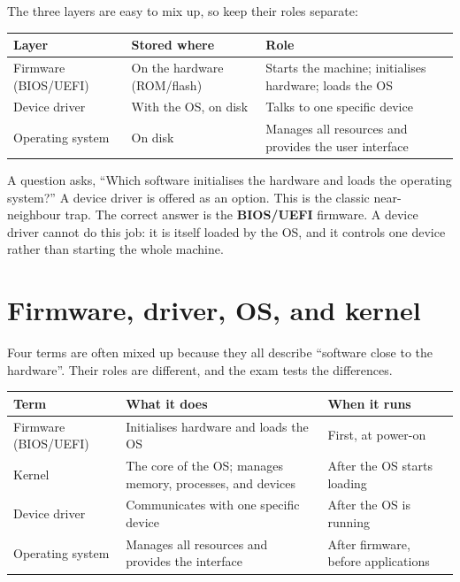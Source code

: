 The three layers are easy to mix up, so keep their roles separate:

\begin{center}
\begin{tabular}{p{}p{}p{}}
\toprule
\textbf{Layer} & \textbf{Stored where} & \textbf{Role} \\
\midrule
Firmware (BIOS/UEFI) & On the hardware (ROM/flash) & Starts the machine; initialises hardware; loads the OS \\
Device driver & With the OS, on disk & Talks to one specific device \\
Operating system & On disk & Manages all resources and provides the user interface \\
\bottomrule
\end{tabular}
\end{center}

\begin{example}
A question asks, ``Which software initialises the hardware and loads the
operating system?'' A device driver is offered as an option. This is the
classic near-neighbour trap. The correct answer is the \textbf{BIOS/UEFI}
firmware. A device driver cannot do this job: it is itself loaded by the OS,
and it controls one device rather than starting the whole machine.
\end{example}

\section{Firmware, driver, OS, and kernel}
Four terms are often mixed up because they all describe ``software close to
the hardware''. Their roles are different, and the exam tests the
differences.

\begin{center}
\begin{tabular}{p{}p{}p{}}
\toprule
\textbf{Term} & \textbf{What it does} & \textbf{When it runs} \\
\midrule
Firmware (BIOS/UEFI) & Initialises hardware and loads the OS & First, at power-on \\
Kernel & The core of the OS; manages memory, processes, and devices & After the OS starts loading \\
Device driver & Communicates with one specific device & After the OS is running \\
Operating system & Manages all resources and provides the interface & After firmware, before applications \\
\bottomrule
\end{tabular}
\end{center}

